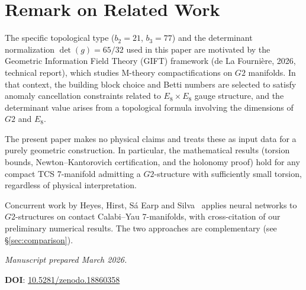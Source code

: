 \documentclass[11pt,a4paper]{article}
\newcommand{\E}{\mathrm{E}}
\newcommand{\Gtwo}{\mathrm{G}_2}
\theoremstyle{remark}
\def\Gtwo{G2}%
\def\E{E}%
\begin{document}
\section{Remark on Related Work}\label{app:related}

The specific topological type ($b_2 = 21$, $b_3 = 77$) and the determinant normalization
$\det(g) = 65/32$ used in this paper are motivated by the Geometric Information Field
Theory (GIFT) framework (de La Fourni\`ere, 2026, technical report), which studies
M-theory compactifications on $\Gtwo$ manifolds. In that context, the building block choice
and Betti numbers are selected to satisfy anomaly cancellation constraints related to
$\E_8 \times \E_8$ gauge structure, and the determinant value arises from a topological formula
involving the dimensions of $\Gtwo$ and $\E_8$.

The present paper makes no physical claims and treats these as input data for a purely
geometric construction. In particular, the mathematical results (torsion bounds,
Newton--Kantorovich certification, and the holonomy proof) hold for any compact TCS
7-manifold admitting a $\Gtwo$-structure with sufficiently small torsion, regardless of
physical interpretation.

Concurrent work by Heyes, Hirst, S\'a Earp and Silva~\cite{heyes2026} applies neural networks to
$\Gtwo$-structures on contact Calabi--Yau 7-manifolds, with cross-citation of our
preliminary numerical results. The two approaches are complementary (see \S\ref{sec:comparison}).

\vspace{2em}
\begin{center}
\textit{Manuscript prepared March 2026.}

\medskip

\textbf{DOI}: \href{https://doi.org/10.5281/zenodo.18860358}{10.5281/zenodo.18860358}
\end{center}
\end{document}
